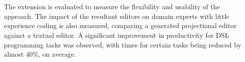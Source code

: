 \documentclass{article}
\begin{document}
\\
\\
The extension is evaluated to measure the flexibility and usability of the approach. The impact of the resultant editors on domain experts with little experience coding is also measured, comparing a generated projectional editor against a textual editor. A significant improvement in productivity for DSL programming tasks was observed, with times for certain tasks being reduced by almost 40\%, on average.
\end{document}
